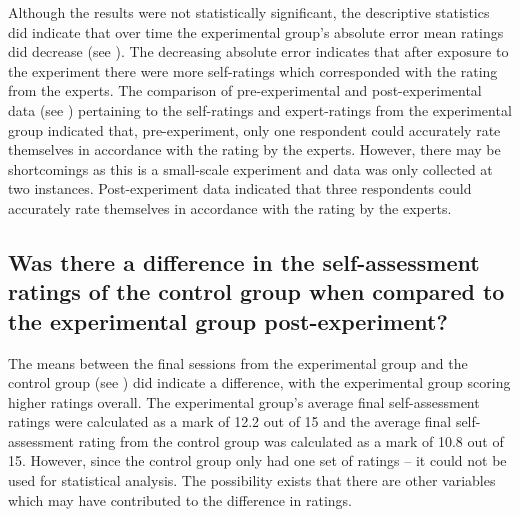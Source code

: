 \documentclass[output=paper]{langsci/langscibook}
\begin{document}
Although the results were not statistically significant, the descriptive statistics did indicate that over time the experimental group’s absolute error mean ratings did decrease (see ). The decreasing absolute error indicates that after exposure to the experiment there were more self-ratings which corresponded with the rating from the experts. The comparison of pre-experimental and post-experimental data (see ) pertaining to the self-ratings and expert-ratings from the experimental group indicated that, pre-experiment, only one respondent could accurately rate themselves in accordance with the rating by the experts. However, there may be shortcomings as this is a small-scale experiment and data was only collected at two instances. Post-experiment data indicated that three respondents could accurately rate themselves in accordance with the rating by the experts.

\subsection{Was there a difference in the self-assessment ratings of the control group when compared to the experimental group post-experiment?}

The means between the final sessions from the experimental group and the control group (see ) did indicate a difference, with the experimental group scoring higher ratings overall. The experimental group’s average final self-assessment ratings were calculated as a mark of 12.2 out of 15 and the average final self-assessment rating from the control group was calculated as a mark of 10.8 out of 15. However, since the control group only had one set of ratings – it could not be used for statistical analysis. The possibility exists that there are other variables which may have contributed to the difference in ratings. 
\end{document}
